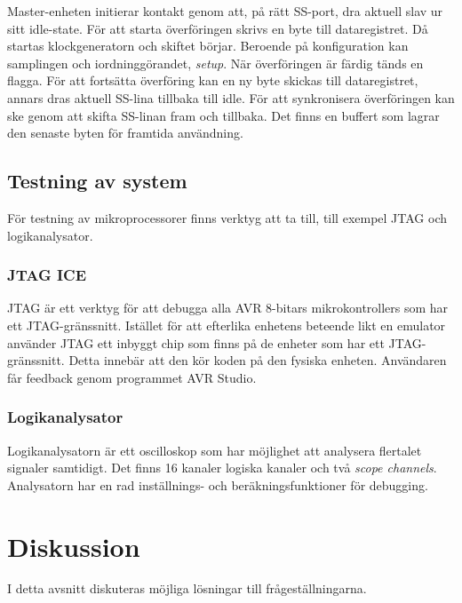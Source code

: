 \documentclass[11pt]{article}
\begin{document}
\begin{flushleft}
Master-enheten initierar kontakt genom att, på rätt SS-port, dra aktuell slav ur sitt idle-state. För att starta överföringen skrivs en byte till dataregistret. Då startas klockgeneratorn och skiftet börjar. Beroende på konfiguration kan samplingen och iordninggörandet, \textit{setup}. När överföringen är färdig tänds en flagga. För att fortsätta överföring kan en ny byte skickas till dataregistret, annars dras aktuell SS-lina tillbaka till idle. För att synkronisera överföringen kan ske genom att skifta SS-linan fram och tillbaka. Det finns en buffert som lagrar den senaste byten för framtida användning.\cite{ATMega16}

\subsection{Testning av system} 

För testning av mikroprocessorer finns verktyg att ta till, till exempel JTAG och logikanalysator.

\subsubsection{JTAG ICE}

JTAG är ett verktyg för att debugga alla AVR 8-bitars mikrokontrollers som har ett JTAG-gränssnitt. Istället för att efterlika enhetens beteende likt en emulator använder JTAG ett inbyggt chip som finns på de enheter som har ett JTAG-gränssnitt. Detta innebär att den kör koden på den fysiska enheten. Användaren får feedback genom programmet AVR Studio. \cite{guideJTAG}

\subsubsection{Logikanalysator}

Logikanalysatorn är ett oscilloskop som har möjlighet att analysera flertalet signaler samtidigt. Det finns 16 kanaler logiska kanaler och  två \textit{scope channels}. Analysatorn har en rad inställnings- och beräkningsfunktioner för debugging. \cite{guideLogic}

\pagebreak

\section{Diskussion}
I detta avsnitt diskuteras möjliga lösningar till frågeställningarna.


\end{flushleft}
\end{document}
